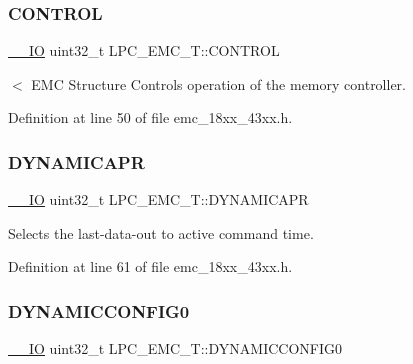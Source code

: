 \subsubsection{\texorpdfstring{C\+O\+N\+T\+R\+OL}{CONTROL}}
{\footnotesize\ttfamily \hyperlink{core__sc300_8h_aec43007d9998a0a0e01faede4133d6be}{\+\_\+\+\_\+\+IO} uint32\+\_\+t L\+P\+C\+\_\+\+E\+M\+C\+\_\+\+T\+::\+C\+O\+N\+T\+R\+OL}

$<$ E\+MC Structure Controls operation of the memory controller. 

Definition at line 50 of file emc\+\_\+18xx\+\_\+43xx.\+h.

\mbox{\label{struct_l_p_c___e_m_c___t_a22eb3969cef2cc3f98ac0590ae88fc03}} 
\subsubsection{\texorpdfstring{D\+Y\+N\+A\+M\+I\+C\+A\+PR}{DYNAMICAPR}}
{\footnotesize\ttfamily \hyperlink{core__sc300_8h_aec43007d9998a0a0e01faede4133d6be}{\+\_\+\+\_\+\+IO} uint32\+\_\+t L\+P\+C\+\_\+\+E\+M\+C\+\_\+\+T\+::\+D\+Y\+N\+A\+M\+I\+C\+A\+PR}

Selects the last-\/data-\/out to active command time. 

Definition at line 61 of file emc\+\_\+18xx\+\_\+43xx.\+h.

\mbox{\label{struct_l_p_c___e_m_c___t_ac9aabbb1bebb557abeb76ea06a7ac1e9}} 
\subsubsection{\texorpdfstring{D\+Y\+N\+A\+M\+I\+C\+C\+O\+N\+F\+I\+G0}{DYNAMICCONFIG0}}
{\footnotesize\ttfamily \hyperlink{core__sc300_8h_aec43007d9998a0a0e01faede4133d6be}{\+\_\+\+\_\+\+IO} uint32\+\_\+t L\+P\+C\+\_\+\+E\+M\+C\+\_\+\+T\+::\+D\+Y\+N\+A\+M\+I\+C\+C\+O\+N\+F\+I\+G0}

